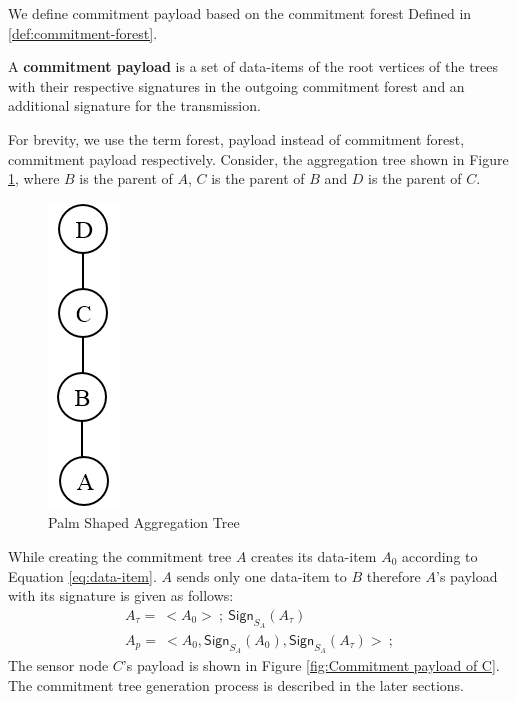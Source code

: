 	We define commitment payload based on the commitment forest Defined in \ref{def:commitment-forest}.
	\begin{definition}
		A \textbf{commitment payload} is a set of data-items of the root vertices of the trees with their respective signatures in the outgoing commitment forest and an additional signature for the transmission.
	\end{definition}
	For brevity, we use the term forest, payload instead of commitment forest, commitment payload respectively.
	Consider, the aggregation tree shown in Figure \ref{fig:Palm aggregation tree}, where $B$ is the parent of $A$, $C$ is the parent of $B$ and $D$ is the parent of $C$. 
	\begin{figure}[h!]
		\centering
		\includegraphics[scale = 1]{images/palm-aggregation-tree.png}
		\caption{Palm Shaped Aggregation Tree}
		\label{fig:Palm aggregation tree}
	\end{figure}
	While creating the commitment tree $A$ creates its data-item $A_{0}$ according to Equation \ref{eq:data-item}.
	$A$ sends only one data-item to $B$ therefore $A$'s payload with its signature is given as follows:
	\begin{equation}
		\label{eq:signing-payload}
		\begin{array}{l}
			A_{\tau} =\ < A_{0} >\ ;\ \textsf{Sign}_{S_{A}}(A_{\tau})\\
			A_{p} =\ <A_{0}, \textsf{Sign}_{S_{A}}(A_{0}), \textsf{Sign}_{S_{A}}(A_{\tau}) >\ ;
		\end{array}
	\end{equation}
	The sensor node $C$'s payload is shown in Figure \ref{fig:Commitment payload of C}.
	The commitment tree generation process is described in the later sections. 
